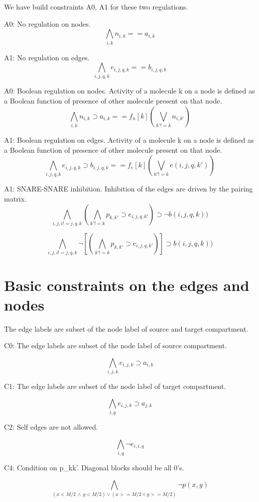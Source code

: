 \documentclass{llncs}
\begin{document}
We have build constraints A0, A1 for these two regulations. \newline

A0: No regulation on nodes.
\[ \bigwedge\limits_{i,k} n_{i,k} == a_{i,k} \, \]  

A1: No regulation on edges.
\[ \bigwedge\limits_{i,j,q,k} e_{i,j,q,k} == b_{i,j,q,k} \, \]  

A0: Boolean regulation on nodes. Activity of a molecule k on a node is defined as a Boolean function of presence of other molecule present on that node.
\[ \bigwedge\limits_{i,k} n_{i,k} \supset a_{i,k} ==   f_n[k] (\bigvee_{ k' != k} n_{i,k'}) \, \]  

A1: Boolean regulation on edges. Activity of a molecule k on a node is defined as a Boolean function of presence of other molecule present on that node.
\[ \bigwedge\limits_{i,j,q,k} e_{i,j,q,k} \supset b_{i,j,q,k} == f_e[k](\bigvee_{k' != k} e(i,j,q,k')) \, \]  

A1: SNARE-SNARE inhibition. Inhibition of the edges are driven by the pairing matrix.
\[ \bigwedge\limits_{i,j,i != j, q, k} (\bigwedge_{k' != k} p_{k,k'} \supset e_{i,j,q,k'}) \supset \neg b(i,j,q,k)) \, \]  

\[ \bigwedge\limits_{i,j,i != j, q, k} \neg [(\bigwedge_{k' != k} p_{k,k'} \supset e_{i,j,q,k'})] \supset b(i,j,q,k)) \, \]  

\section{Basic constraints on the edges and nodes}
The edge labels are subset of the node label of source and target compartment. \newline

C0: The edge labels are subset of the node label of source compartment.

\[ \bigwedge\limits_{i,j,k} e_{i,j,k} \supset a_{i,k} \, \]  

C1: The edge labels are subset of the node label of target compartment.

\[ \bigwedge\limits_{i,q}  e_{i,j,k} \supset a_{j,k} \, \]  

C2: Self edges are not allowed. 

\[  \bigwedge\limits_{i,q} \neg e_{i,i,q} \, \]

C4: Condition on p\_kk'. Diagonal blocks should be all 0's.

\[ \bigwedge\limits_{(x < M/2 \, \land  \, y < M/2) \lor  (x >= M/2 \land y >= M/2)} \neg p(x,y) \, \]
\end{document}
